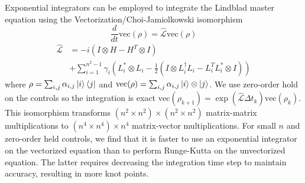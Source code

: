 Exponential integrators can be employed to integrate the Lindblad master equation
using the Vectorization/Choi-Jamiolkowski isomorphism \cite{Landi2018}
\begin{equation}
  \frac{d}{dt} \textrm{vec}({\rho}) = \hat{\mathcal{L}} \textrm{vec}({\rho})
\end{equation}
\begin{equation}
  \begin{aligned}
    \hat{\mathcal{L}} &= -i(I \otimes H - H^{T} \otimes I)\\
    &+ \sum_{i = 1}^{n^{2} - 1} \gamma_{i}
    (L_{i}^{*} \otimes L_{i} - \frac{1}{2} (I \otimes L_{i}^{\dagger}L_{i}
    - L_{i}^{T}L_{i}^{*} \otimes I))
  \end{aligned}
\end{equation}
where $\rho = \sum_{i, j} \alpha_{i, j} \ket{i}\bra{j}$
and $\textrm{vec}(\rho) = \sum_{i, j} \alpha_{i, j} \ket{i} \otimes \ket{j}$.
We use zero-order hold on the controls so the integration is exact
$\textrm{vec}(\rho_{k + 1}) = \exp(\hat{\mathcal{L}} \Delta t_{k}) \textrm{vec}(\rho_{k})$.
This isomorphism transforms $(n^{2} \times n^{2}) \times (n^{2} \times n^{2})$
matrix-matrix multiplications to $(n^{4} \times n^{4}) \times n^{4}$ matrix-vector
multiplications. For small $n$ and zero-order held controls, we find that it is
faster to use an exponential integrator on the vectorized equation than to perform
Runge-Kutta on the unvectorized equation. The latter requires decreasing the integration
time step to maintain accuracy, resulting in more knot points.

